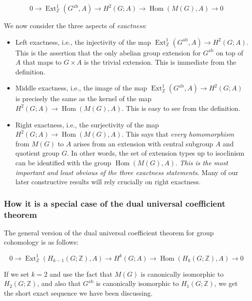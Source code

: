 \begin{equation*}
  0 \to \operatorname{Ext}^1_{\mathbb{Z}}(G^{\operatorname{ab}},A) \to H^2(G;A) \to \operatorname{Hom}(M(G),A) \to 0
\end{equation*}

We now consider the three aspects of {\em exactness}:

\begin{itemize}
\item Left exactness, i.e., the injectivity of the map
  $\operatorname{Ext}^1_{\mathbb{Z}}(G^{\operatorname{ab}},A) \to
  H^2(G;A)$. This is the assertion that the only abelian group
  extension for $G^{\operatorname{ab}}$ on top of $A$ that maps to $G
  \times A$ is the trivial extension. This is immediate from the
  definition.
\item Middle exactness, i.e., the image of the map
  $\operatorname{Ext}^1_{\mathbb{Z}}(G^{\operatorname{ab}},A) \to
  H^2(G;A)$ is precisely the same as the kernel of the map $ H^2(G;A)
  \to \operatorname{Hom}(M(G),A)$. This is easy to see from the
  definition.
\item Right exactness, i.e., the surjectivity of the map $H^2(G;A) \to
  \operatorname{Hom}(M(G),A)$. This says that {\em every homomorphism}
  from $M(G)$ to $A$ arises from an extension with central subgroup
  $A$ and quotient group $G$. In other words, the set of extension
  types up to isoclinism can be identified with the group
  $\operatorname{Hom}(M(G),A)$. {\em This is the most important and
    least obvious of the three exactness statements}. Many of our
  later constructive results will rely crucially on right exactness.
\end{itemize}

\subsubsection{How it is a special case of the dual universal coefficient theorem}

The general version of the dual universal coefficient theorem for
group cohomology is as follows:

$$0 \to \operatorname{Ext}^1_{\mathbb{Z}}(H_{k-1}(G;\mathbb{Z}),A) \to H^k(G;A) \to \operatorname{Hom}(H_k(G;\mathbb{Z}),A) \to 0$$

If we set $k = 2$ and use the fact that $M(G)$ is canonically
isomorphic to $H_2(G;\mathbb{Z})$, and also that
$G^{\operatorname{ab}}$ is canonically isomorphic to
$H_1(G;\mathbb{Z})$, we get the short exact sequence we have been
discussing.

